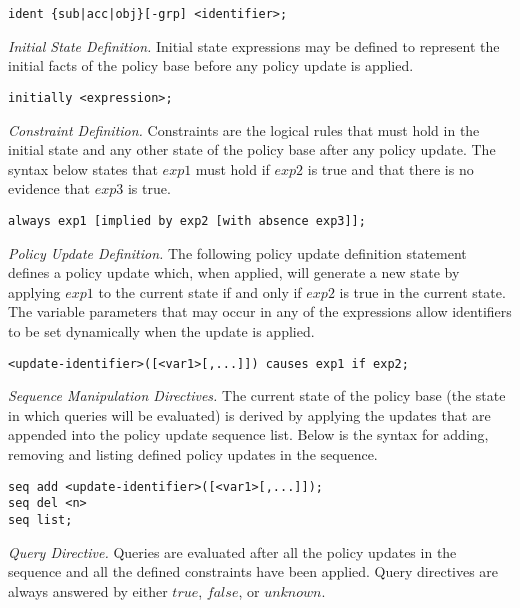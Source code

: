 \documentclass{llncs}
\begin{document}
    \begin{verbatim}ident {sub|acc|obj}[-grp] <identifier>;\end{verbatim}

    \noindent
    \emph{Initial State Definition.} Initial state expressions may be defined
    to represent the initial facts of the policy base before any policy update
    is applied.

    \begin{verbatim}initially <expression>;\end{verbatim}

    \noindent
    \emph{Constraint Definition.} Constraints are the logical rules that must
    hold in the initial state and any other state of the policy base after
    any policy update. The syntax below states that $exp1$ must hold if
    $exp2$ is true and that there is no evidence that $exp3$ is true.

    \begin{verbatim}always exp1 [implied by exp2 [with absence exp3]];\end{verbatim}

    \noindent
    \emph{Policy Update Definition.} The following policy update definition
    statement defines a policy update which, when applied, will generate a new
    state by applying $exp1$ to the current state if and only if $exp2$ is
    true in the current state. The variable parameters that may occur in any
    of the expressions allow identifiers to be set dynamically when the update
    is applied.

    \begin{verbatim}<update-identifier>([<var1>[,...]]) causes exp1 if exp2;\end{verbatim}

    \noindent
    \emph{Sequence Manipulation Directives.} The current state of the policy
    base (the state in which queries will be evaluated) is derived by applying
    the updates that are appended into the policy update sequence list. Below
    is the syntax for adding, removing and listing defined policy updates in
    the sequence.

\begin{verbatim}
seq add <update-identifier>([<var1>[,...]]);
seq del <n>
seq list;
\end{verbatim}

    \noindent
    \emph{Query Directive.} Queries are evaluated after all the policy
    updates in the sequence and all the defined constraints have been
    applied. Query directives are always answered by either $true$,
    $false$, or $unknown$.
\end{document}
